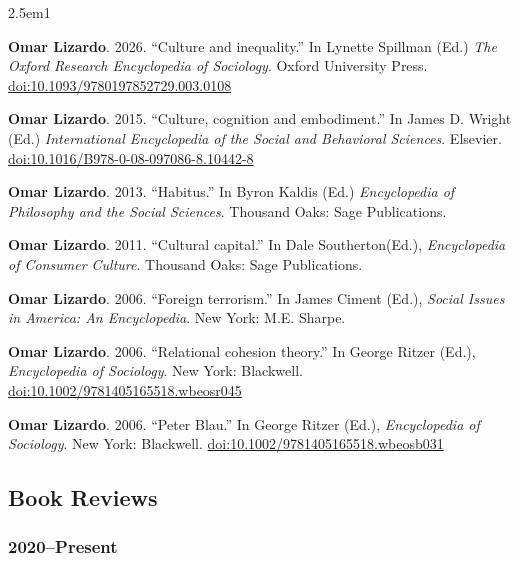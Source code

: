 \documentclass[
]{article}
\newenvironment{cventry}{\begin{hangparas}{2.5em}{1}}{\end{hangparas}}
\begin{document}
\begin{cventry}

\textbf{Omar Lizardo}. 2026. ``Culture and inequality.'' In Lynette
Spillman (Ed.) \emph{The Oxford Research Encyclopedia of Sociology}.
Oxford University Press.
\href{https://doi.org/10.1093/9780197852729.003.0108}{doi:10.1093/9780197852729.003.0108}

\textbf{Omar Lizardo}. 2015. ``Culture, cognition and embodiment.'' In
James D. Wright (Ed.) \emph{International Encyclopedia of the Social and
Behavioral Sciences}. Elsevier.
\href{https://doi.org/10.1016/B978-0-08-097086-8.10442-8}{doi:10.1016/B978-0-08-097086-8.10442-8}

\textbf{Omar Lizardo}. 2013. ``Habitus.'' In Byron Kaldis (Ed.)
\emph{Encyclopedia of Philosophy and the Social Sciences}. Thousand
Oaks: Sage Publications.

\textbf{Omar Lizardo}. 2011. ``Cultural capital.'' In Dale
Southerton(Ed.), \emph{Encyclopedia of Consumer Culture}. Thousand Oaks:
Sage Publications.

\textbf{Omar Lizardo}. 2006. ``Foreign terrorism.'' In James Ciment
(Ed.), \emph{Social Issues in America: An Encyclopedia}. New York: M.E.
Sharpe.

\textbf{Omar Lizardo}. 2006. ``Relational cohesion theory.'' In George
Ritzer (Ed.), \emph{Encyclopedia of Sociology}. New York: Blackwell.
\href{https://doi.org/10.1002/9781405165518.wbeosr045}{doi:10.1002/9781405165518.wbeosr045}

\textbf{Omar Lizardo}. 2006. ``Peter Blau.'' In George Ritzer (Ed.),
\emph{Encyclopedia of Sociology}. New York: Blackwell.
\href{https://doi.org/10.1002/9781405165518.wbeosb031}{doi:10.1002/9781405165518.wbeosb031}

\end{cventry}

\subsection{Book Reviews}\label{book-reviews}

\subsubsection{2020--Present}\label{present-1}
\end{document}
